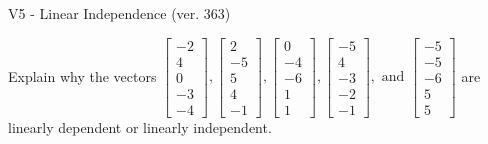 \begin{exercise}
  \begin{exerciseTitle}V5 - Linear Independence (ver. 363)\end{exerciseTitle}
  \begin{exerciseStatement}
    Explain why the vectors \(\left[\begin{array}{r}
-2 \\
4 \\
0 \\
-3 \\
-4
\end{array}\right] , \left[\begin{array}{r}
2 \\
-5 \\
5 \\
4 \\
-1
\end{array}\right] , \left[\begin{array}{r}
0 \\
-4 \\
-6 \\
1 \\
1
\end{array}\right] , \left[\begin{array}{r}
-5 \\
4 \\
-3 \\
-2 \\
-1
\end{array}\right] , \text{ and } \left[\begin{array}{r}
-5 \\
-5 \\
-6 \\
5 \\
5
\end{array}\right]\) are linearly dependent or linearly independent.	



\end{exerciseStatement}
\end{exercise}

